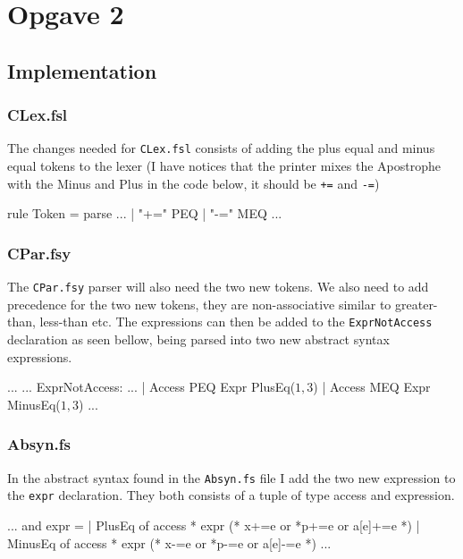 \section{Opgave 2}
\subsection{Implementation}
\subsubsection*{CLex.fsl}
The changes needed for \texttt{CLex.fsl} consists of adding the plus equal and
minus equal tokens to the lexer (I have notices that the printer mixes the
Apostrophe with the Minus and Plus in the code below, it should be \texttt{+=}
and \texttt{-=})
\begin{fs}
rule Token = parse
...
  | "+="            { PEQ }
  | "-="            { MEQ }
...
\end{fs}
\subsubsection*{CPar.fsy}
The \texttt{CPar.fsy} parser will also need the two new tokens. We also need to
add precedence for the two new tokens, they are non-associative similar to
greater-than, less-than etc. The expressions can then be added to the
\texttt{ExprNotAccess} declaration as seen bellow, being parsed into two new
abstract syntax expressions.
\begin{ccode}
...
...
ExprNotAccess:
...
  | Access PEQ Expr                     { PlusEq($1, $3)      } 
  | Access MEQ Expr                     { MinusEq($1, $3)     } 
...
\end{ccode}
\subsubsection*{Absyn.fs}
In the abstract syntax found in the \texttt{Absyn.fs} file I add the two new
expression to the \texttt{expr} declaration. They both consists of a tuple of
type access and expression.
\begin{fs}
...
and expr =                                                         
  | PlusEq of access * expr          (* x+=e or *p+=e or a[e]+=e    *)
  | MinusEq of access * expr         (* x-=e or *p-=e or a[e]-=e    *)
...
\end{fs}

